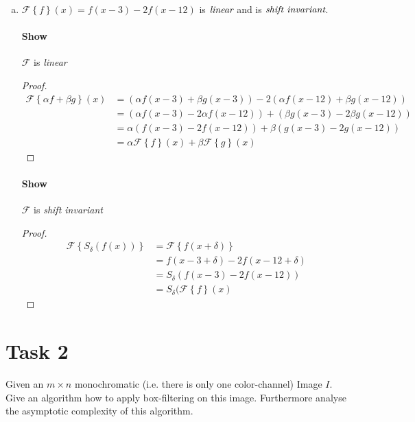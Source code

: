 \documentclass{paper}
\begin{document}
\begin{enumerate}[(a)]
\item $\mathcal{F} \left \{ f \right\} (x) = f(x-3)-2f(x-12)$ is $\emph{linear}$ and is $\emph{shift invariant}$.

\paragraph{Show} $\mathcal{F}$ is \emph{linear} \\
\begin{proof}
\begin{align*}
    \mathcal{F} \left \{\alpha f + \beta g \right\}(x) 
    &= (\alpha f(x-3) + \beta g(x-3))-2(\alpha f(x-12) + \beta g(x-12)) \\
    &= (\alpha f(x-3) - 2\alpha f(x-12)) + (\beta g(x-3) - 2\beta g(x-12)) \\
    &= \alpha  (f(x-3) - 2 f(x-12)) + \beta (g(x-3) - 2 g(x-12)) \\
    &= \alpha \mathcal{F} \left \{f\right\}(x) + \beta \mathcal{F} \left \{g \right\}(x)
\end{align*}
\end{proof}

\paragraph{Show} $\mathcal{F}$ is \emph{shift invariant} \\
\begin{proof}
\begin{align*}
    \mathcal{F} \left \{S_\delta (f(x)) \right\} 
    &= \mathcal{F} \left\{ f(x+\delta) \right\} \\
    &= f(x-3 + \delta) - 2f(x-12 + \delta) \\
    &= S_{\delta} (f(x-3)-2f(x-12)) \\
    &= S_\delta(\mathcal{F}\left \{f \right\}(x)
\end{align*}
\end{proof}


\end{enumerate}

    
\section*{Task 2}

Given an $m \times n$ monochromatic (i.e. there is only one color-channel) Image $I$. 
Give an algorithm how to apply box-filtering on this image. Furthermore analyse the asymptotic complexity of this algorithm.
\end{document}
